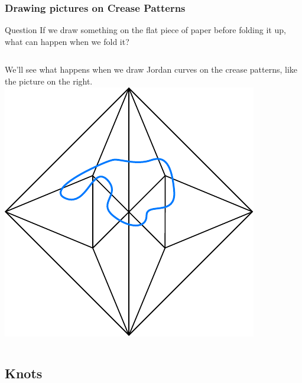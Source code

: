 \documentclass{beamer}
\begin{document}
\begin{frame}
\frametitle{Drawing pictures on Crease Patterns}
\begin{block}{Question}
If we draw something on the flat piece of paper before folding it up, what can happen when we fold it? 
\end{block}
\pause
\begin{columns}[c]
We'll see what happens when we draw Jordan curves on the crease patterns, like the picture on the right. 
\includegraphics[width=\textwidth]{knot_pix/j-curve-birdbase.pdf}
\end{columns}
\end{frame}

\subsection{Knots}
\end{document}
